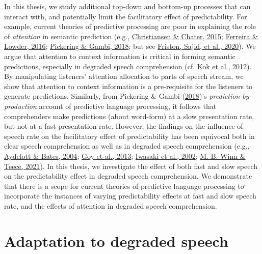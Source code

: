 \documentclass[a4paper, nobind]{templates/ociamthesis}
\begin{document}
In this thesis, we study additional top-down and bottom-up processes that can interact with, and potentially limit the facilitatory effect of predictability.
For example, current theories of predictive processing are poor in explaining the role of \emph{attention} in semantic prediction (e.g., \protect\hyperlink{ref-Christiansen2015}{Christiansen \& Chater, 2015}; \protect\hyperlink{ref-Ferreira2016}{Ferreira \& Lowder, 2016}; \protect\hyperlink{ref-Pickering2018}{Pickering \& Gambi, 2018}; but see \protect\hyperlink{ref-Friston2020b}{Friston, Sajid, et al., 2020}).
We argue that attention to context information is critical in forming semantic predictions,
especially in degraded speech comprehension (cf. \protect\hyperlink{ref-Kok2012}{Kok et al., 2012}).
By manipulating listeners' attention allocation to parts of speech stream, we show that attention to context information is a pre-requisite for the listeners to generate predictions.
Similarly, from Pickering \& Gambi (\protect\hyperlink{ref-Pickering2018}{2018})'s \emph{prediction-by-production} account of predictive language processing,
it follows that comprehenders make predictions (about word-form) at a slow presentation rate, but not at a fast presentation rate.
However, the findings on the influence of speech rate on the facilitatory effect of predictability has been equivocal both in clear speech comprehension as well as in degraded speech comprehension (e.g., \protect\hyperlink{ref-Aydelott2004}{Aydelott \& Bates, 2004}; \protect\hyperlink{ref-Goy2013}{Goy et al., 2013}; \protect\hyperlink{ref-Iwasaki2002}{Iwasaki et al., 2002}; \protect\hyperlink{ref-Winn2021b}{M. B. Winn \& Teece, 2021}).
In this thesis, we investigate the effect of both fast and slow speech on the predictability effect in degraded speech comprehension.
We demonstrate that there is a scope for current theories of predictive language processing to` incorporate
the instances of varying predictability effects at fast and slow speech rate,
and the effects of attention in degraded speech comprehension.

\hypertarget{background-adaptation}{%
\section{Adaptation to degraded speech}\label{background-adaptation}}
\end{document}
